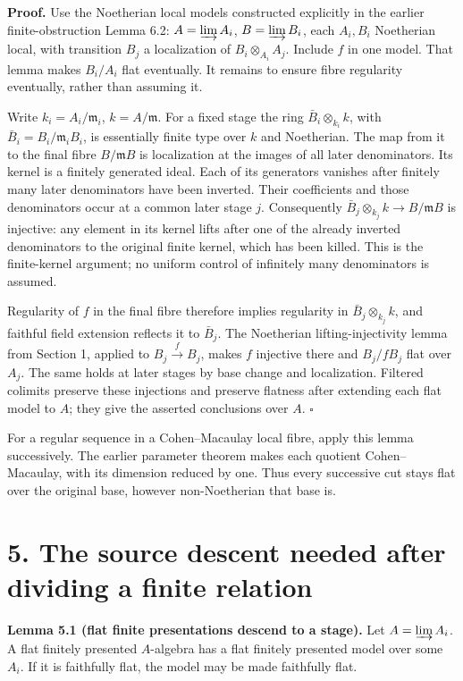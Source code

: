 \documentclass[11pt,a4paper,openany]{report}
\begin{document}
\textbf{Proof.} Use the Noetherian local models constructed explicitly in the earlier finite-obstruction Lemma 6.2: \(A=\varinjlim A_i\), \(B=\varinjlim B_i\), each \(A_i,B_i\) Noetherian local, with transition \(B_j\) a localization of \(B_i\otimes_{A_i}A_j\). Include \(f\) in one model. That lemma makes \(B_i/A_i\) flat eventually. It remains to ensure fibre regularity eventually, rather than assuming it.

Write \(k_i=A_i/\mathfrak m_i\), \(k=A/\mathfrak m\). For a fixed stage the ring \(\bar B_i\otimes_{k_i}k\), with \(\bar B_i=B_i/\mathfrak m_iB_i\), is essentially finite type over \(k\) and Noetherian. The map from it to the final fibre \(B/\mathfrak m B\) is localization at the images of all later denominators. Its kernel is a finitely generated ideal. Each of its generators vanishes after finitely many later denominators have been inverted. Their coefficients and those denominators occur at a common later stage \(j\). Consequently \(\bar B_j\otimes_{k_j}k\to B/\mathfrak m B\) is injective: any element in its kernel lifts after one of the already inverted denominators to the original finite kernel, which has been killed. This is the finite-kernel argument; no uniform control of infinitely many denominators is assumed.

Regularity of \(f\) in the final fibre therefore implies regularity in \(\bar B_j\otimes_{k_j}k\), and faithful field extension reflects it to \(\bar B_j\). The Noetherian lifting-injectivity lemma from Section 1, applied to \(B_j\xrightarrow fB_j\), makes \(f\) injective there and \(B_j/fB_j\) flat over \(A_j\). The same holds at later stages by base change and localization. Filtered colimits preserve these injections and preserve flatness after extending each flat model to \(A\); they give the asserted conclusions over \(A\). \(\square\)

For a regular sequence in a Cohen--Macaulay local fibre, apply this lemma successively. The earlier parameter theorem makes each quotient Cohen--Macaulay, with its dimension reduced by one. Thus every successive cut stays flat over the original base, however non-Noetherian that base is.

\section{5. The source descent needed after dividing a finite relation}\label{AG-RG-S07-the-source-descent-needed-after-dividing-a-finite-relation}

\textbf{Lemma 5.1 (flat finite presentations descend to a stage).} Let \(A=\varinjlim A_i\). A flat finitely presented \(A\)-algebra has a flat finitely presented model over some \(A_i\). If it is faithfully flat, the model may be made faithfully flat.
\end{document}
